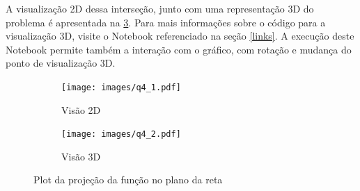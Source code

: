 \documentclass[10pt, a4paper]{article}
\begin{document}
A visualização 2D dessa interseção, junto com uma representação 3D do problema é apresentada na 
\cref{fig:q4}. Para mais informações sobre o código para a visualização 3D, visite o Notebook 
referenciado na seção \ref{links}. A execução deste Notebook permite também a interação com o 
gráfico, com rotação e mudança do ponto de visualização 3D.


\begin{figure}
    \centering
    \begin{subfigure}[b]{0.45\textwidth}
        \centering
        \texttt{[image: images/q4\_1.pdf]}
        \caption{Visão 2D}
        \label{fig:q4_1}
    \end{subfigure}
    \hfill
    \begin{subfigure}[b]{0.5\textwidth}
        \centering
        \texttt{[image: images/q4\_2.pdf]}
        \caption{Visão 3D}
        \label{fig:q4_2}
    \end{subfigure}
    \hfill
       \caption{Plot da projeção da função no plano da reta}
       \label{fig:q4}
\end{figure}





\end{document}
